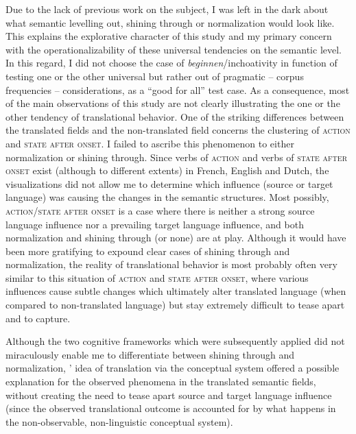 Due to the lack of previous work on the subject, I was left in the dark about what semantic levelling out, shining through or normalization would look like. This explains the explorative character of this study and my primary concern with the operationalizability of these universal tendencies on the semantic level. In this regard, I did not choose the case of \textit{beginnen}\slash inchoativity in function of testing one or the other universal but rather out of pragmatic – corpus frequencies – considerations, as a ``good for all'' test case. As a consequence, most of the main observations of this study are not clearly illustrating the one or the other tendency of translational behavior. One of the striking differences between the translated fields and the non-translated field concerns the clustering of \textsc{action} and \textsc{state after onset}. I failed to ascribe this phenomenon to either normalization or shining through. Since verbs of \textsc{action} and verbs of \textsc{state after onset} exist (although to different extents) in French, English and Dutch, the visualizations did not allow me to determine which influence (source or target language) was causing the changes in the semantic structures. Most possibly, \textsc{action}\slash \textsc{state after onset} is a case where there is neither a strong source language influence nor a prevailing target language influence, and both normalization and shining through (or none) are at play. Although it would have been more gratifying to expound clear cases of shining through and normalization, the reality of translational behavior is most probably often very similar to this situation of \textsc{action} and \textsc{state after onset}, where various influences cause subtle changes which ultimately alter translated language (when compared to non-translated language) but stay extremely difficult to tease apart and to capture. 

Although the two cognitive frameworks which were subsequently applied did not miraculously enable me to differentiate between shining through and normalization, \citeauthor{paradis_language_1980}’ idea of translation via the conceptual system offered a possible explanation for the observed phenomena in the translated semantic fields, without creating the need to tease apart source and target language influence (since the observed translational outcome is accounted for by what happens in the non-observable, non-linguistic conceptual system).

